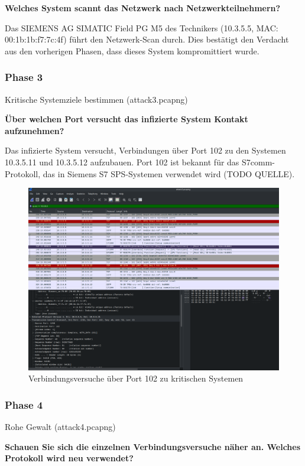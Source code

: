 \documentclass[
    a4paper,
    pagesize,
	pdftex,
    12pt,
]{scrartcl}
\begin{document}
\textbf{Welches System scannt das Netzwerk nach Netzwerkteilnehmern?}

Das SIEMENS AG SIMATIC Field PG M5 des Technikers (10.3.5.5, MAC: 00:1b:1b:f7:7c:4f) führt den Netzwerk-Scan durch. Dies bestätigt den Verdacht aus den vorherigen Phasen, dass dieses System kompromittiert wurde.

\subsubsection{Phase 3}
Kritische Systemziele bestimmen (attack3.pcapng)

\textbf{Über welchen Port versucht das infizierte System Kontakt aufzunehmen?}

Das infizierte System versucht, Verbindungen über Port 102 zu den Systemen 10.3.5.11 und 10.3.5.12 aufzubauen. Port 102 ist bekannt für das S7comm-Protokoll, das in Siemens S7 SPS-Systemen verwendet wird (TODO QUELLE).

\begin{figure}[H]
    \centering
    \includegraphics[width=\textwidth]{ws-port-102-connections.png}
    \caption{Verbindungsversuche über Port 102 zu kritischen Systemen}
    \label{fig:ws-port-102-connections}
\end{figure}

\subsubsection{Phase 4}
Rohe Gewalt (attack4.pcapng)

\textbf{Schauen Sie sich die einzelnen Verbindungsversuche näher an. Welches Protokoll wird neu verwendet?}
\end{document}
